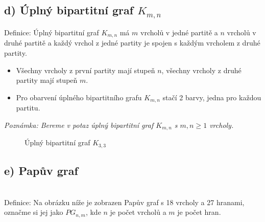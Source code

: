 \documentclass[10pt, a4paper]{ReportSheet}
\begin{document}
    \subsection{d) Úplný bipartitní graf $K_{m,n}$}
    Definice: Úplný bipartitní graf $K_{m,n}$ má $m$ vrcholů v jedné partitě a $n$ vrcholů v druhé partitě a každý vrchol z jedné partity je spojen s každým vrcholem z druhé partity.

    \begin{itemize}
        \item Všechny vrcholy z první partity mají stupeň $n$, všechny vrcholy z druhé partity mají stupeň $m$.
        \item Pro obarvení úplného bipartitního grafu $K_{m,n}$ stačí 2 barvy, jedna pro každou partitu.
    \end{itemize}
    \textit{Poznámka: Bereme v potaz úplný bipartitní graf $K_{m,n}$ s $m,n \geq 1$ vrcholy.}

    \begin{figure}[H]
        \centering
        \caption{Úplný bipartitní graf $K_{3,3}$}
        \label{fig:ukol-2-1d-uplny-bipartitni-graf}
    \end{figure}


    \subsection{e) Papův graf}\\
    Definice: Na obrázku níže je zobrazen Papův graf s 18 vrcholy a 27 hranami, označme si jej jako $PG_{n, m}$, kde $
    n$ je počet vrcholů a $m$ je počet hran.
\end{document}
